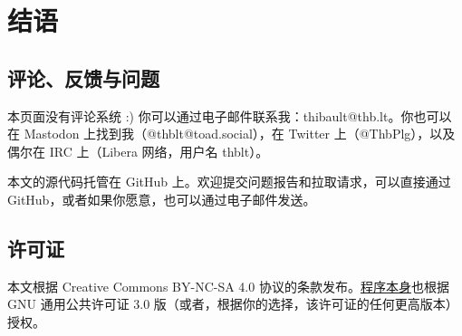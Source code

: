 \documentclass{ctexart}
\theoremstyle{remark}
\theoremstyle{warningstyle}
\theoremstyle{warningstyle}
\begin{document}
\section{结语}
\subsection{评论、反馈与问题}
本页面没有评论系统 :) 你可以通过电子邮件联系我：thibault@thb.lt。你也可以在 Mastodon 上找到我（@thblt@toad.social），在 Twitter 上（@ThbPlg），以及偶尔在 IRC 上（Libera 网络，用户名 thblt）。

本文的源代码托管在 GitHub 上。欢迎提交问题报告和拉取请求，可以直接通过 GitHub，或者如果你愿意，也可以通过电子邮件发送。
\subsection{许可证}
本文根据 Creative Commons BY-NC-SA 4.0 协议的条款发布。\href{https://wyag.thb.lt/wyag.zip}{程序本身}也根据 GNU 通用公共许可证 3.0 版（或者，根据你的选择，该许可证的任何更高版本）授权。
\end{document}

